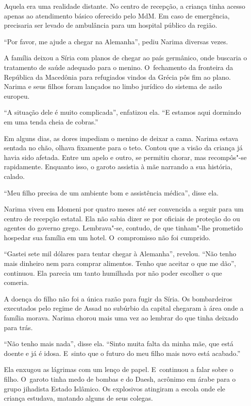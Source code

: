 Aquela era uma realidade distante. No centro de recepção, a criança
tinha acesso apenas ao atendimento básico oferecido pelo MdM. Em caso de
emergência, precisaria ser levado de ambulância para um hospital público
da região.

``Por favor, me ajude a chegar na Alemanha'', pediu Narima diversas
vezes.

A família deixou a Síria com planos de chegar ao país germânico, onde
buscaria o tratamento de saúde adequado para o menino. O~fechamento da
fronteira da República da Macedônia para refugiados vindos da Grécia pôs
fim ao plano. Narima e seus filhos foram lançados no limbo jurídico do
sistema de asilo europeu.

``A situação dele é muito complicada'', enfatizou ela. ``E estamos aqui
dormindo em uma tenda cheia de cobras.''

Em alguns dias, as dores impediam o menino de deixar a cama. Narima
estava sentada no chão, olhava fixamente para o teto. Contou que a visão
da criança já havia sido afetada. Entre um apelo e outro, se permitiu
chorar, mas recompôs"-se rapidamente. Enquanto isso, o garoto assistia à
mãe narrando a sua história, calado.

``Meu filho precisa de um ambiente bom e assistência médica'', disse
ela.

Narima viveu em Idomeni por quatro meses até ser convencida a seguir
para um centro de recepção estatal. Ela não sabia dizer se por oficiais
de proteção do  ou agentes do governo grego. Lembrava"-se, contudo,
de que tinham"-lhe prometido hospedar sua família em um hotel. O~compromisso não foi cumprido.

``Gastei sete mil dólares para tentar chegar à Alemanha'', revelou.
``Não tenho mais dinheiro nem para comprar alimentos. Tenho que aceitar
o que me dão'', continuou. Ela parecia um tanto humilhada por não poder
escolher o que comeria.

A doença do filho não foi a única razão para fugir da Síria. Os
bombardeiros executados pelo regime de Assad no subúrbio da capital
chegaram à área onde a família morava. Narima chorou mais uma vez ao
lembrar do que tinha deixado para trás.

``Não tenho mais nada'', disse ela. ``Sinto muita falta da minha mãe,
que está doente e já é idosa. E~sinto que o futuro do meu filho mais
novo está acabado.''

Ela enxugou as lágrimas com um lenço de papel. E~continuou a falar sobre
o filho. O~garoto tinha medo de bombas e do Daesh, acrônimo em árabe
para o grupo jihadista Estado Islâmico. Os explosivos atingiram a escola
onde ele criança estudava, matando alguns de seus colegas.

